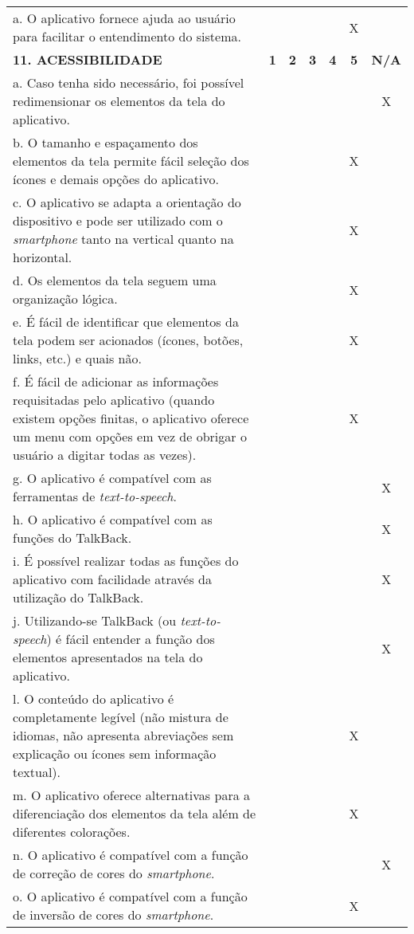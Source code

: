 \documentclass[portuguese,oneside]{tcc}
\begin{document}
\begin{center}
\begin{longtabu}{|L{25em}|c|c|c|c|c|c|}
																		a. O aplicativo fornece ajuda ao usuário para facilitar o entendimento do sistema. & & & & & X & \\ 
																		\textbf{11. ACESSIBILIDADE} & \textbf{1} & \textbf{2} & \textbf{3} & \textbf{4} & \textbf{5} & \textbf{N/A} \\ 
																		a. Caso tenha sido necessário, foi possível redimensionar os elementos da tela do aplicativo. & & & & & & X \\ 
																		b. O tamanho e espaçamento dos elementos da tela permite fácil seleção dos ícones e demais opções do aplicativo. & & & & & X & \\ 
																		c. O aplicativo se adapta a orientação do dispositivo e pode ser utilizado com o \emph{smartphone} tanto na vertical quanto na horizontal. & & & & & X & \\ 
																		d. Os elementos da tela seguem uma organização lógica. & & & & & X & \\ 
																		e. É fácil de identificar que elementos da tela podem ser acionados (ícones, botões, links, etc.) e quais não. & & & & & X & \\ 
																		f. É fácil de adicionar as informações requisitadas pelo aplicativo (quando existem opções finitas, o aplicativo oferece um menu com opções em vez de obrigar o usuário a digitar todas as vezes). & & & & & X & \\ 
																		g. O aplicativo é compatível com as ferramentas de \emph{text-to-speech}. & & & & & & X \\ 
																		h. O aplicativo é compatível com as funções do TalkBack. & & & & & & X \\ 
																		i. É possível realizar todas as funções do aplicativo com facilidade através da utilização do TalkBack.	& & & & & & X \\ 
																		j. Utilizando-se TalkBack (ou \emph{text-to-speech}) é fácil entender a função dos elementos apresentados na tela do aplicativo. & & & & & & X \\ 
																		l. O conteúdo do aplicativo é completamente legível (não mistura de idiomas, não apresenta abreviações sem explicação ou ícones sem informação textual). & & & & & X & \\ 
																		m. O aplicativo oferece alternativas para a diferenciação dos elementos da tela além de diferentes colorações. & & & & & X & \\ 
																		n. O aplicativo é compatível com a função de correção de cores do \emph{smartphone}. & & & & & & X \\ 
																		o. O aplicativo é compatível com a função de inversão de cores do \emph{smartphone}. & & & & & X & \\ 
																	\end{longtabu}
																\end{center}
																
\end{document}
